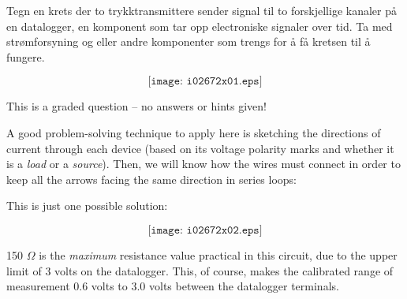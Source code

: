 


Tegn en krets der to trykktransmittere sender signal til to forskjellige kanaler på en datalogger, en komponent som tar opp electroniske signaler over tid. Ta med strømforsyning og eller andre komponenter som trengs for å få kretsen til å fungere. 


$$\texttt{[image: i02672x01.eps]}$$

\vfil 

\eject






This is a graded question -- no answers or hints given!







A good problem-solving technique to apply here is sketching the directions of current through each device (based on its voltage polarity marks and whether it is a {\it load} or a {\it source}).  Then, we will know how the wires must connect in order to keep all the arrows facing the same direction in series loops:

\vskip 10pt

This is just one possible solution:

$$\texttt{[image: i02672x02.eps]}$$

150 $\Omega$ is the {\it maximum} resistance value practical in this circuit, due to the upper limit of 3 volts on the datalogger.  This, of course, makes the calibrated range of measurement 0.6 volts to 3.0 volts between the datalogger terminals.





